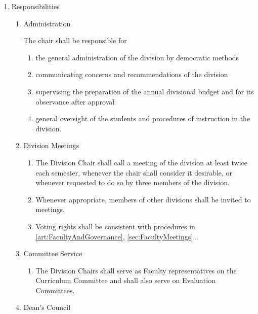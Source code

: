 \documentclass{manual}
\newcommand{\itemLevelA}{\alph*.}
\newcommand{\itemLevelB}{\arabic*)}
\newcommand{\itemLevelC}{\alph*)}
\newcommand{\itemRefA}{\alph*}
\newcommand{\itemRefB}{\arabic*}
\newcommand{\itemRefC}{\alph*}
\begin{document}
\begin{enumerate}[label=\itemLevelA,ref=\itemRefA]
	\item \label{item:responsibilities01} Responsibilities

		\begin{enumerate}[label=\itemLevelB,ref=\itemRefB]
		\item Administration

			The chair shall be responsible for

			\begin{enumerate}[label=\itemLevelC,ref=\itemRefC]
			\item the general administration of the division by democratic methods
			\item communicating concerns and recommendations of the division
			\item supervising the preparation of the annual divisional budget and for its observance after approval
			\item general oversight of the students and procedures of instruction in the division.
			\end{enumerate}
	
		\item Division Meetings

			\begin{enumerate}[label=\itemLevelC,ref=\itemRefC]
			\item The Division Chair shall call a meeting of the division at least twice each semester, whenever the chair shall consider it desirable, or whenever requested to do so by three members of the division.
			\item Whenever appropriate, members of other divisions shall be invited to meetings.
			\item Voting rights shall be consistent with procedures in \cref{art:FacultyAndGovernance}, \cref{sec:FacultyMeetings}...
			\end{enumerate}
	
		\item Committee Service

			\begin{enumerate}[label=\itemLevelC,ref=\itemRefC]
			\item The Division Chairs shall serve as Faculty representatives on the Curriculum Committee and shall also serve on Evaluation Committees. 
			\end{enumerate}
	
		\item \label{iitem:deansCouncil02} Dean's Council


\end{enumerate}
\end{enumerate}
\end{document}
